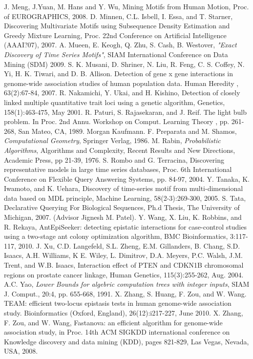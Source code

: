 \documentclass{article}
\theoremstyle{definition}
\theoremstyle{remark}
\begin{document}
\begin{thebibliography}{}
J. Meng, J.Yuan, M. Hans and Y. Wu, Mining Motifs from Human Motion, Proc. of EUROGRAPHICS, 2008.
D. Minnen, C.L. Isbell, I. Essa, and T. Starner, Discovering Multivariate Motifs using Subsequence Density Estimation and Greedy Mixture Learning, Proc. 22nd Conference on Artificial Intelligence (AAAI?07), 2007.
 A. Mueen, E. Keogh, Q. Zhu, S. Cash,  B. Westover, \emph{"Exact Discovery of Time Series Motifs"}, SIAM International Conference on Data Mining (SDM) 2009.
S. K. Musani, D. Shriner, N. Liu, R. Feng, C. S. Coffey, N. Yi, H. K. Tiwari, and D. B. Allison. Detection of gene x gene interactions in genome-wide association studies of human population data. Human Heredity , 63(2):67-84, 2007.
R. Nakamichi, Y. Ukai, and H. Kishino, Detection of closely linked multiple quantitative trait loci using a genetic algorithm, Genetics, 158(1):463-475, May 2001.
 R. Paturi, S. Rajasekaran, and J. Reif. The light bulb problem. In Proc. 2nd Annu. Workshop on Comput. Learning Theory , pp. 261-268, San Mateo, CA, 1989. Morgan Kaufmann.
F. Preparata and M. Shamos, \emph{Computational Geometry}, Springer Verlag, 1986.
M. Rabin, \emph{Probabilistic Algorithms}, Algorithms and Complexity, Recent Results and New Directions, Academic Press, pp 21-39, 1976.
S. Rombo and G. Terracina, Discovering representative models in large time series databases, Proc. 6th International Conference on Flexible Query Answering Systems, pp. 84-97, 2004.
Y. Tanaka, K. Iwamoto, and K. Uehara, Discovery of time-series motif from multi-dimensional data based on MDL principle, Machine Learning, 58(2-3):269-300, 2005.
S. Tata, Declarative Querying For Biological Sequences, Ph.d Thesis, The University of Michigan, 2007. (Advisor Jignesh M. Patel).
Y. Wang, X. Liu, K. Robbins, and R. Rekaya, AntEpiSeeker: detecting epistatic interactions for case-control studies using a two-stage ant colony optimization algorithm, BMC Bioinformatics, 3:117-117, 2010.
J. Xu, C.D. Langefeld, S.L. Zheng, E.M. Gillanders, B. Chang, S.D. Isaacs, A.H. Williams, K E. Wiley, L. Dimitrov, D.A. Meyers, P.C. Walsh, J.M. Trent, and W.B. Isaacs, Interaction effect of PTEN and CDKN1B chromosomal regions on prostate cancer linkage, Human Genetics, 115(3):255-262, Aug. 2004.
A.C. Yao, \emph{Lower Bounds for algebric computation trees with integer inputs}, SIAM J. Comput., 20:4, pp. 655-668, 1991.
X. Zhang, S. Huang, F. Zou, and W. Wang. TEAM: efficient two-locus epistasis tests in human genome-wide association study. Bioinformatics (Oxford, England), 26(12):i217-227, June 2010.
X. Zhang, F. Zou, and W. Wang, Fastanova: an efficient algorithm for genome-wide association study, in Proc. 14th ACM SIGKDD international conference on Knowledge discovery and data mining (KDD), pages 821-829, Las Vegas, Nevada, USA, 2008.










\end{thebibliography}
\end{document}

